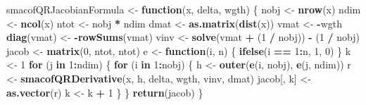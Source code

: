 \documentclass[
  12pt,
]{article}
\newenvironment{Shaded}{\begin{snugshade}}{\end{snugshade}}
\newcommand{\ControlFlowTok}[1]{\textcolor[rgb]{0.13,0.29,0.53}{\textbf{#1}}}
\newcommand{\DecValTok}[1]{\textcolor[rgb]{0.00,0.00,0.81}{#1}}
\newcommand{\FunctionTok}[1]{\textcolor[rgb]{0.13,0.29,0.53}{\textbf{#1}}}
\newcommand{\NormalTok}[1]{#1}
\newcommand{\OtherTok}[1]{\textcolor[rgb]{0.56,0.35,0.01}{#1}}
\newcommand{\SpecialCharTok}[1]{\textcolor[rgb]{0.81,0.36,0.00}{\textbf{#1}}}
\begin{document}
\begin{Shaded}
\begin{Highlighting}[]
\NormalTok{smacofQRJacobianFormula }\OtherTok{\textless{}{-}} \ControlFlowTok{function}\NormalTok{(x, delta, wgth) \{}
\NormalTok{  nobj }\OtherTok{\textless{}{-}} \FunctionTok{nrow}\NormalTok{(x)}
\NormalTok{  ndim }\OtherTok{\textless{}{-}} \FunctionTok{ncol}\NormalTok{(x)}
\NormalTok{  ntot }\OtherTok{\textless{}{-}}\NormalTok{ nobj }\SpecialCharTok{*}\NormalTok{ ndim}
\NormalTok{  dmat }\OtherTok{\textless{}{-}} \FunctionTok{as.matrix}\NormalTok{(}\FunctionTok{dist}\NormalTok{(x))}
\NormalTok{  vmat }\OtherTok{\textless{}{-}} \SpecialCharTok{{-}}\NormalTok{wgth}
  \FunctionTok{diag}\NormalTok{(vmat) }\OtherTok{\textless{}{-}} \SpecialCharTok{{-}}\FunctionTok{rowSums}\NormalTok{(vmat)}
\NormalTok{  vinv }\OtherTok{\textless{}{-}} \FunctionTok{solve}\NormalTok{(vmat }\SpecialCharTok{+}\NormalTok{ (}\DecValTok{1} \SpecialCharTok{/}\NormalTok{ nobj)) }\SpecialCharTok{{-}}\NormalTok{ (}\DecValTok{1} \SpecialCharTok{/}\NormalTok{ nobj)}
\NormalTok{  jacob }\OtherTok{\textless{}{-}} \FunctionTok{matrix}\NormalTok{(}\DecValTok{0}\NormalTok{, ntot, ntot)}
\NormalTok{  e }\OtherTok{\textless{}{-}} \ControlFlowTok{function}\NormalTok{(i, n) \{}
    \FunctionTok{ifelse}\NormalTok{(i }\SpecialCharTok{==} \DecValTok{1}\SpecialCharTok{:}\NormalTok{n, }\DecValTok{1}\NormalTok{, }\DecValTok{0}\NormalTok{)}
\NormalTok{  \}}
\NormalTok{  k }\OtherTok{\textless{}{-}} \DecValTok{1}
  \ControlFlowTok{for}\NormalTok{ (j }\ControlFlowTok{in} \DecValTok{1}\SpecialCharTok{:}\NormalTok{ndim) \{}
    \ControlFlowTok{for}\NormalTok{ (i }\ControlFlowTok{in} \DecValTok{1}\SpecialCharTok{:}\NormalTok{nobj) \{}
\NormalTok{      h }\OtherTok{\textless{}{-}} \FunctionTok{outer}\NormalTok{(}\FunctionTok{e}\NormalTok{(i, nobj), }\FunctionTok{e}\NormalTok{(j, ndim))}
\NormalTok{      r }\OtherTok{\textless{}{-}} \FunctionTok{smacofQRDerivative}\NormalTok{(x, h, delta, wgth, vinv, dmat)}
\NormalTok{      jacob[, k] }\OtherTok{\textless{}{-}} \FunctionTok{as.vector}\NormalTok{(r)}
\NormalTok{      k }\OtherTok{\textless{}{-}}\NormalTok{ k }\SpecialCharTok{+} \DecValTok{1}
\NormalTok{    \}}
\NormalTok{  \}}
  \FunctionTok{return}\NormalTok{(jacob)}
\NormalTok{\}}


\end{Highlighting}
\end{Shaded}
\end{document}
